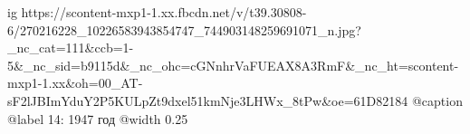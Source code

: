  
 
 
 
 

\ifcmt
  ig https://scontent-mxp1-1.xx.fbcdn.net/v/t39.30808-6/270216228_10226583943854747_744903148259691071_n.jpg?_nc_cat=111&ccb=1-5&_nc_sid=b9115d&_nc_ohc=cGNnhrVaFUEAX8A3RmF&_nc_ht=scontent-mxp1-1.xx&oh=00_AT-sF2lJBImYduY2P5KULpZt9dxel51kmNje3LHWx_8tPw&oe=61D82184
	@caption @label 14: 1947 год
  @width 0.25
\fi
